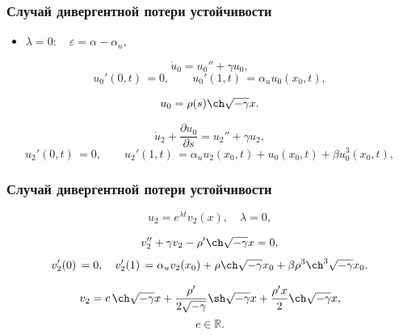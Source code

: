 \documentclass[fullscreen=true, unicode, bookmarks=false]{beamer}
\begin{document}
\begin{frame}
\frametitle{ Случай дивергентной потери устойчивости }

\begin{itemize}
\item { $ \lambda = 0: \quad \varepsilon=\alpha-\alpha_u, $
}
\end{itemize}

\medskip

\begin{equation}
	\dot u_0 = u_0'' + \gamma u_0,
\end{equation}
\begin{equation}
	u_0'(0, t) \, = 0, \qquad u_0'(1, t) \, = \alpha_u u_0(x_0, t),
\end{equation}

$$ u_0 = \rho(s) \ch \sqrt{-\gamma} x. $$

\medskip

\begin{equation}
	\dot u_2 + \frac{\partial u_0}{\partial s} = u_2'' + \gamma u_2,
\end{equation}
\begin{equation}
	u_2'(0, t) \, = 0, \qquad u_2'(1, t) \, = \alpha_u u_2(x_0, t) + u_0(x_0, t) + \beta u_0^3(x_0, t),
\end{equation}

\end{frame}

\begin{frame}
\frametitle{ Случай дивергентной потери устойчивости }

$$ u_2 = e^{\lambda t}v_2(x), \quad \lambda = 0, $$

\medskip

\begin{equation}
	v_2'' + \gamma v_2 - \rho' \ch \sqrt{-\gamma} x = 0,
\end{equation}
\begin{equation}
	v_2'(0) \, = 0, \quad v_2'(1) \, = \alpha_u v_2(x_0) + \rho \ch \sqrt{-\gamma} x_0 + \beta \rho^3\ch^3 \sqrt{-\gamma} x_0.
\end{equation}

\medskip

$$ v_2 = c\,\ch \sqrt{-\gamma} x + \frac{\rho'}{2\sqrt{-\gamma}}\sh\sqrt{-\gamma}x + \frac{\rho'x}{2} \ch\sqrt{-\gamma}x, $$
$$ c \in \mathbb{R}. $$

\end{frame}
\end{document}

